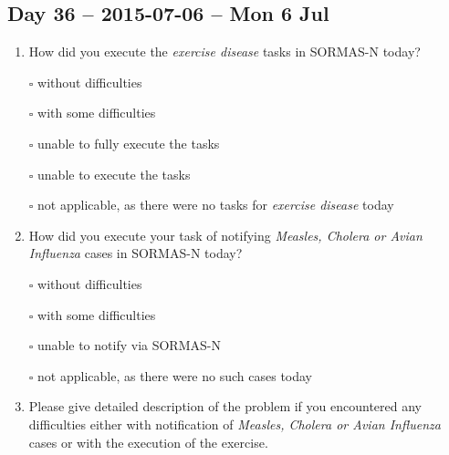 \documentclass[a4paper, titlepage]{tufte-handout}
\begin{document}
\subsection{Day 36 -- 2015-07-06 -- Mon  6 Jul}
\label{sec-8-26}
\begin{enumerate}
\item How did you execute the \emph{exercise disease} tasks in SORMAS-N today?

\quad $\square$ without difficulties

\quad $\square$ with some difficulties

\quad $\square$ unable to fully execute the tasks

\quad $\square$ unable to execute the tasks

\quad $\square$ not applicable, as there were no tasks for \emph{exercise disease} today

\item How did you execute your task of notifying \emph{Measles, Cholera or Avian Influenza} cases in SORMAS-N today?

\quad $\square$ without difficulties

\quad $\square$ with some difficulties

\quad $\square$ unable to notify via SORMAS-N

\quad $\square$ not applicable, as there were no such cases today

\item Please give detailed description of the problem if you encountered any difficulties either with notification of \emph{Measles, Cholera or Avian Influenza} cases or with the execution of the exercise.

\hrulefill

\hrulefill

\hrulefill

\hrulefill

\hrulefill

\hrulefill

\hrulefill

\hrulefill

\hrulefill

\hrulefill
\end{enumerate}

\newpage
\end{document}
